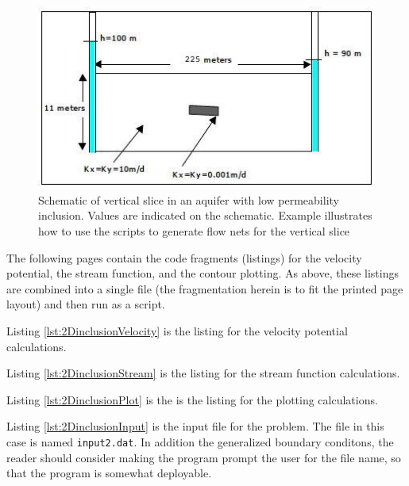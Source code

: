 \begin{figure}[h!] %
   \centering
   \includegraphics[width=4.5in]{./19-FlowNets/aquifer-2d-lowKinclusion.jpg} 
   \caption{Schematic of vertical slice in an aquifer with low permeability inclusion.  Values are indicated on the schematic.  Example illustrates how to use the scripts to generate flow nets for the vertical slice }
   \label{fig:aquifer-2d-lowKinclusion}
\end{figure}

The following pages contain the code fragments (listings) for the velocity potential, the stream function, and the contour plotting.  As above, these listings are combined into a single file (the fragmentation herein is to fit the printed page layout) and then run as a script. 

Listing \ref{lst:2DinclusionVelocity} is the listing for the velocity potential calculations.

Listing \ref{lst:2DinclusionStream} is the listing for the stream function calculations.

Listing \ref{lst:2DinclusionPlot} is the is the listing for the plotting calculations.

Listing \ref{lst:2DinclusionInput} is the input file for the problem.  The file in this case is named \texttt{input2.dat}.  
In addition the generalized boundary conditons, the reader should consider making the program prompt the user for the file name, so that the program is somewhat deployable.

\clearpage


